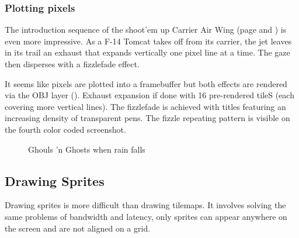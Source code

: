 \subsubsection{Plotting pixels}

The introduction sequence of the shoot'em up Carrier Air Wing (page \pageref{caw_color} and \pageref{caw_rgb}) is even more impressive. As a F-14 Tomcat takes off from its carrier, the jet leaves in its trail an exhaust that expands vertically one pixel line at a time. The gaze then disperses with a fizzlefade effect. 

It seems like pixels are plotted into a framebuffer but both effects are rendered via the OBJ layer (). Exhaust expansion if done with 16 pre-rendered tileS (each covering more vertical lines). The fizzlefade is achieved with titles featuring an increasing density of transparent pens. The fizzle repeating pattern is visible on the fourth color coded screenshot.


 

\vfill
\begin{figure}[!b]
 \caption*{Ghouls 'n Ghosts when rain falls}%
 \end{figure}%
\pagebreak

 \label{caw_color}





\pagebreak


 \label{caw_rgb}





\pagebreak

\subsection{Drawing Sprites}
Drawing sprites is more difficult than drawing tilemaps. It involves solving the same problems of bandwidth and latency, only sprites can appear anywhere on the screen and are not aligned on a grid.

